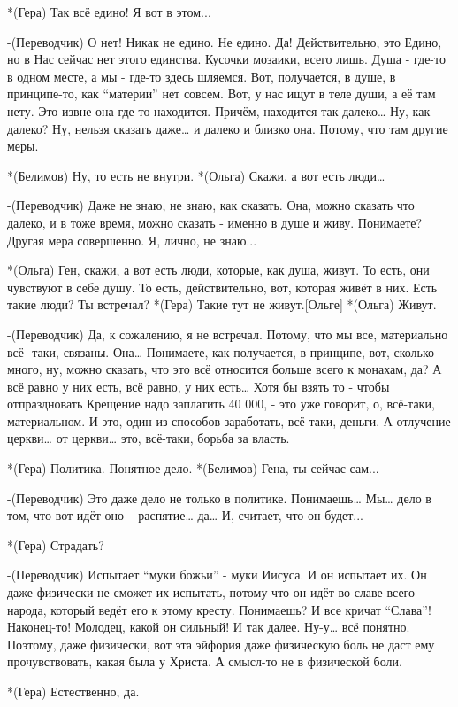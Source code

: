 *(Гера) Так всё едино! Я вот в этом...

-(Переводчик) О нет! Никак не едино. Не едино. Да! Действительно, это Едино, но в Нас сейчас нет этого единства. Кусочки мозаики, всего лишь. Душа - где-то в одном месте, а мы - где-то здесь шляемся. Вот, получается, в душе, в принципе-то, как “материи” нет совсем. Вот, у нас ищут в теле души, а её там нету. Это извне она где-то находится. Причём, находится так далеко… Ну, как далеко? Ну, нельзя сказать даже… и далеко и близко она. Потому, что там другие меры.

*(Белимов) Ну, то есть не внутри.
*(Ольга) Скажи, а вот есть люди…

-(Переводчик) Даже не знаю, не знаю, как сказать. Она, можно сказать что далеко, и в тоже время, можно сказать - именно в душе и живу. Понимаете? Другая мера совершенно. Я, лично, не знаю...

*(Ольга) Ген, скажи, а вот есть люди, которые, как душа, живут. То есть, они чувствуют в себе душу. То есть,  действительно, вот, которая живёт в них. Есть такие люди? Ты встречал?
*(Гера) Такие тут не живут.[Ольге]
*(Ольга) Живут.

-(Переводчик) Да, к сожалению, я не встречал. Потому, что мы все, материально всё- таки, связаны. Она… Понимаете, как получается, в принципе, вот, сколько много, ну, можно сказать, что это всё относится больше всего к монахам, да? А всё равно у них есть, всё равно, у них есть… Хотя бы взять то - чтобы отпраздновать Крещение надо заплатить 40 000, -  это уже говорит, о, всё-таки, материальном. И это, один из способов заработать, всё-таки, деньги. А отлучение церкви… от церкви… это, всё-таки, борьба за власть. 

*(Гера) Политика. Понятное дело.
*(Белимов) Гена, ты сейчас сам...

-(Переводчик) Это даже дело не только в политике. Понимаешь… Мы… дело в том, что вот идёт оно – распятие… да… И, считает, что он будет...

*(Гера) Страдать?

-(Переводчик) Испытает “муки божьи” -  муки Иисуса. И он испытает их. Он даже физически не сможет их испытать, потому что он идёт во славе всего народа, который ведёт его к этому кресту. Понимаешь? И все кричат “Слава”! Наконец-то! Молодец, какой он сильный! И так далее. Ну-у… всё понятно.  Поэтому, даже физически, вот эта эйфория даже физическую боль не даст ему прочувствовать, какая была у Христа. А смысл-то не в физической боли.

*(Гера) Естественно, да.

